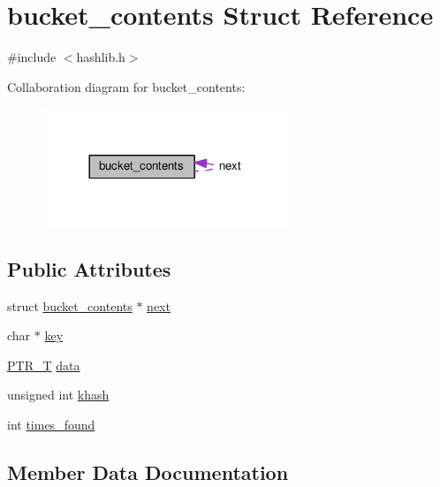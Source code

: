 \hypertarget{structbucket__contents}{}\section{bucket\+\_\+contents Struct Reference}
\label{structbucket__contents}


{\ttfamily \#include $<$hashlib.\+h$>$}



Collaboration diagram for bucket\+\_\+contents\+:
\nopagebreak
\begin{figure}[H]
\begin{center}
\leavevmode
\includegraphics[width=209pt]{structbucket__contents__coll__graph}
\end{center}
\end{figure}
\subsection*{Public Attributes}
\begin{DoxyCompactItemize}
\item 
struct \hyperlink{structbucket__contents}{bucket\+\_\+contents} $\ast$ \hyperlink{structbucket__contents_a626ac20a4ec314e2028fd964ec63551e}{next}
\item 
char $\ast$ \hyperlink{structbucket__contents_a17facbf14d154f264ffb2d80b55a2e45}{key}
\item 
\hyperlink{xmalloc_8h_abbf31fec203727613ea15ba47bb8f344}{P\+T\+R\+\_\+T} \hyperlink{structbucket__contents_a4e30edeb29dde704f0fcf69bc4c73b4c}{data}
\item 
unsigned int \hyperlink{structbucket__contents_a8c8862e218acedb6bf4295849b9bab32}{khash}
\item 
int \hyperlink{structbucket__contents_a6dba923dd1c449e85201c91607a43ce0}{times\+\_\+found}
\end{DoxyCompactItemize}


\subsection{Member Data Documentation}
